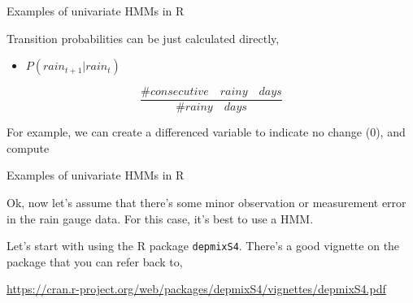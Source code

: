 \documentclass[
  ignorenonframetext,
]{beamer}
\newenvironment{Shaded}{\begin{snugshade}}{\end{snugshade}}
\newcommand{\DecValTok}[1]{\textcolor[rgb]{0.00,0.00,0.81}{#1}}
\newcommand{\KeywordTok}[1]{\textcolor[rgb]{0.13,0.29,0.53}{\textbf{#1}}}
\newcommand{\NormalTok}[1]{#1}
\newcommand{\OperatorTok}[1]{\textcolor[rgb]{0.81,0.36,0.00}{\textbf{#1}}}
\newcommand{\OtherTok}[1]{\textcolor[rgb]{0.56,0.35,0.01}{#1}}
\newcommand{\StringTok}[1]{\textcolor[rgb]{0.31,0.60,0.02}{#1}}
\providecommand{\tightlist}{%
  \setlength{\itemsep}{0pt}\setlength{\parskip}{0pt}}
\begin{document}
\begin{frame}[fragile]{Examples of univariate HMMs in R}
\protect\hypertarget{examples-of-univariate-hmms-in-r-4}{}

Transition probabilities can be just calculated directly,

\begin{itemize}
\tightlist
\item
  \(P(rain_{t+1} | rain_{t})\)
\end{itemize}

\[\frac { \# consecutive \quad rainy \quad days }{ \# rainy \quad days }\]

For example, we can create a differenced variable to indicate no change
(0), and compute

\begin{Shaded}
\end{Shaded}

\end{frame}

\begin{frame}[fragile]{Examples of univariate HMMs in R}
\protect\hypertarget{examples-of-univariate-hmms-in-r-5}{}

Ok, now let's assume that there's some minor observation or measurement
error in the rain gauge data. For this case, it's best to use a HMM.

Let's start with using the R package \texttt{depmixS4}. There's a good
vignette on the package that you can refer back to,

\url{https://cran.r-project.org/web/packages/depmixS4/vignettes/depmixS4.pdf}

\end{frame}
\end{document}
